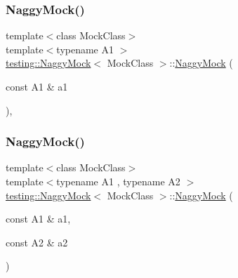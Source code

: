 \mbox{\label{classtesting_1_1_naggy_mock_ae43ea6c6a6b66fe31cb14f93e0be5718}} 
\subsubsection{\texorpdfstring{Naggy\+Mock()}{NaggyMock()}\hspace{0.1cm}{\footnotesize\ttfamily [2/11]}}
{\footnotesize\ttfamily template$<$class Mock\+Class$>$ \\
template$<$typename A1 $>$ \\
\hyperlink{classtesting_1_1_naggy_mock}{testing\+::\+Naggy\+Mock}$<$ Mock\+Class $>$\+::\hyperlink{classtesting_1_1_naggy_mock}{Naggy\+Mock} (\begin{DoxyParamCaption}\item[{const A1 \&}]{a1 }\end{DoxyParamCaption})\hspace{0.3cm}{\ttfamily [inline]}, {\ttfamily [explicit]}}

\mbox{\label{classtesting_1_1_naggy_mock_a4241363ab2ca3a2e7baa5ead980175e6}} 
\subsubsection{\texorpdfstring{Naggy\+Mock()}{NaggyMock()}\hspace{0.1cm}{\footnotesize\ttfamily [3/11]}}
{\footnotesize\ttfamily template$<$class Mock\+Class$>$ \\
template$<$typename A1 , typename A2 $>$ \\
\hyperlink{classtesting_1_1_naggy_mock}{testing\+::\+Naggy\+Mock}$<$ Mock\+Class $>$\+::\hyperlink{classtesting_1_1_naggy_mock}{Naggy\+Mock} (\begin{DoxyParamCaption}\item[{const A1 \&}]{a1,  }\item[{const A2 \&}]{a2 }\end{DoxyParamCaption})\hspace{0.3cm}{\ttfamily [inline]}}

